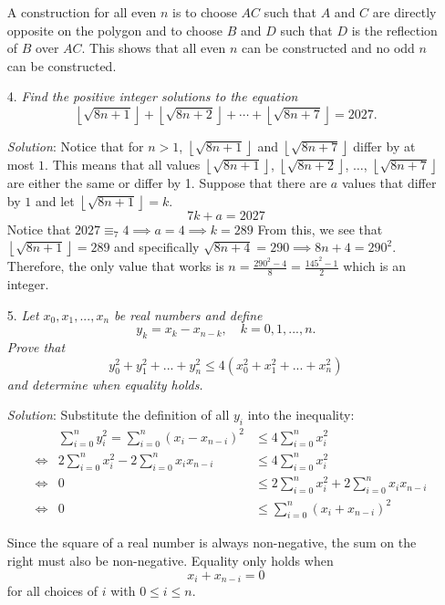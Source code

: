 \documentclass{article}
\begin{document}
\begin{enumerate}[1.]
A construction for all even $n$ is to choose $AC$ such that $A$ and $C$ are directly opposite on the polygon and to choose $B$ and $D$ such that $D$ is the reflection of $B$ over $AC$. This shows that all even $n$ can be constructed and no odd $n$ can be constructed.


\item[4.] %
\newcommand{\floorsqrt}[1]{\left\lfloor\sqrt{#1}\right\rfloor} 
\textit{
Find the positive integer solutions to the equation
\[ \floorsqrt{8n+1} +\floorsqrt{8n+2} +\dotsb +\floorsqrt{8n+7} = 2027. \]}

\textit{Solution}:
Notice that for $n > 1$, $\floorsqrt{8n + 1}$ and $\floorsqrt{8n + 7}$ differ by at most $1$. This means that all values $\floorsqrt{8n + 1}$, $\floorsqrt{8n + 2}$, $\dots$, $\floorsqrt{8n + 7}$ are either the same or differ by 1. Suppose that there are $a$ values that differ by $1$ and let $\floorsqrt{8n + 1} = k$.
$$7k + a = 2027$$
Notice that $2027 \equiv _7 4 \implies a = 4 \implies k = 289$ From this, we see that $\floorsqrt{8n + 1} = 289$ and specifically $\sqrt{8n + 4} = 290 \implies 8n + 4 = 290^2$. Therefore, the only value that works is $n = \frac{290^2 - 4}{8} = \frac{145^2 - 1}{2}$ which is an integer.


\item[5.] %
\textit{
Let $x_0, x_1,..., x_n$ be real numbers and define
\[y_k=x_k-x_{n-k}, \quad k=0,1,...,n.\]
Prove that 
\[y_0^2 + y_1^2+...+ y_n^2 \leq 4(x_0^2 + x_1^2 + ... + x_n^2) \]
and determine when equality holds.
}

\textit{Solution}: 
Substitute the definition of all $y_i$ into the inequality:
\begin{align*}
  & & \sum_{i = 0}^{n}y_i^2 = \sum_{i = 0}^{n}(x_i - x_{n-i})^2 & \leq 4\sum_{i = 0}^{n}x_i^2 \\
  & \iff& 2\sum_{i = 0}^{n}x_i^2 - 2\sum_{i = 0}^{n}x_ix_{n-i} & \leq 4\sum_{i = 0}^{n}x_i^2 \\
  & \iff& 0 & \leq 2\sum_{i = 0}^{n}x_i^2 + 2\sum_{i = 0}^{n}x_ix_{n-i} \\
  & \iff& 0 & \leq \sum_{i = 0}^{n}(x_i + x_{n-i})^2 
\end{align*}

Since the square of a real number is always non-negative, the sum on the right must also be non-negative. Equality only holds when
$$x_i + x_{n-i} = 0$$
for all choices of $i$ with $0 \le i \le n$.

\end{enumerate}
\end{document}
